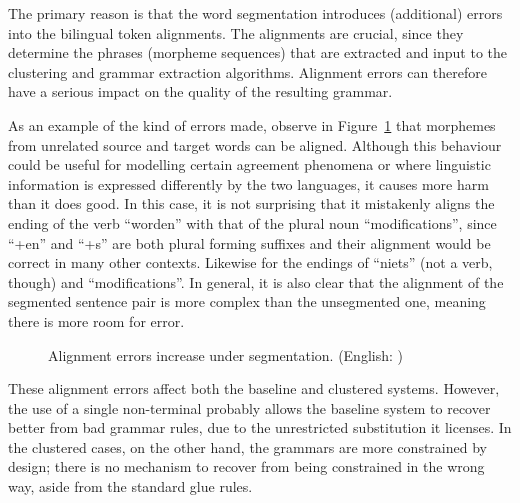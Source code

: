 The primary reason is that the word segmentation introduces (additional) errors into the bilingual token alignments.
The alignments are crucial, since they determine the phrases (morpheme sequences) that are extracted and input to the clustering and grammar extraction algorithms.
Alignment errors can therefore have a serious impact on the quality of the resulting grammar.

As an example of the kind of errors made, observe in Figure~\ref{fig:m_alignment_error} that morphemes from unrelated source and target words can be aligned.
Although this behaviour could be useful for modelling certain agreement phenomena or where linguistic information is expressed differently by the two languages, it causes more harm than it does good. 
In this case, it is not surprising that it mistakenly aligns the ending of the verb ``worden'' with that of the plural noun ``modifications'', since ``+en'' and ``+s'' are both plural forming suffixes and their alignment would be correct in many other contexts.
Likewise for the endings of ``niets'' (not a verb, though) and ``modifications''.
In general, it is also clear that the alignment of the segmented sentence pair is more complex than the unsegmented one, meaning there is more room for error.

\begin{figure}[hb]
  \centering
  \hspace{10mm}
  \caption{Alignment errors increase under segmentation. (English: )}
  \label{fig:m_alignment_error}
\end{figure}

These alignment errors affect both the baseline and clustered systems.
However, the use of a single non-terminal probably allows the baseline system to recover better from bad grammar rules, due to the unrestricted substitution it licenses.
In the clustered cases, on the other hand, the grammars are more constrained by design; there is no mechanism to recover from being constrained in the wrong way, aside from the standard glue rules.

